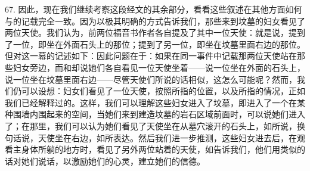 67. 因此，现在我们继续考察这段经文的其余部分，看看这些叙述在其他方面如何与的记载完全一致。因为以极其明确的方式告诉我们，那些来到坟墓的妇女看见了两位天使。我们认为，前两位福音书作者各自提及了其中一位天使：就是说，提到了一位，即坐在外面石头上的那位；提到了另一位，即坐在坟墓里面右边的那位。但对这一幕的记述如下：因此问题在于：如果在同一事件中记载那两位天使站在那些妇女旁边，而和却说她们各自看见一位天使坐着——说一位坐在外面的石头上，说一位坐在坟墓里面右边——尽管天使们所说的话相似，这怎么可能呢？然而，我们仍可以设想：妇女们看见了一位天使，按照所指的位置，以及所指的情况，正如我们已经解释过的。这样，我们可以理解这些妇女进入了坟墓，即进入了一个在某种围墙内围起来的空间，当她们来到建造坟墓的岩石区域前面时，可以说她们进入了；在那里，我们可以认为她们看见了天使坐在从墓穴滚开的石头上，如所说，换句话说，天使坐在右边，如所表达。然后我们进一步推测，这些妇女进去后，在观看主身体所躺的地方时，看见了另外两位站着的天使，如告诉我们，他们用类似的话对她们说话，以激励她们的心灵，建立她们的信德。\par

